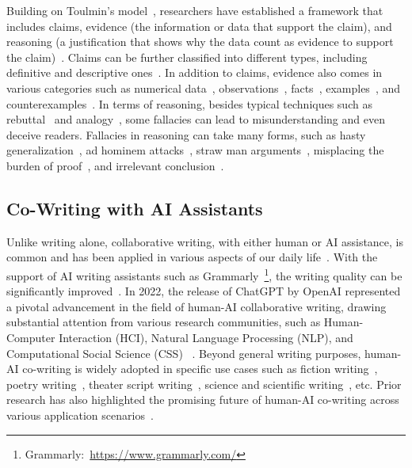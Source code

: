 Building on Toulmin's model~\cite{toulmin_uses_2003}, researchers have established a framework that includes claims, evidence (the information or data that support the claim), and reasoning (a justification that shows why the data count as evidence to support the claim)~\cite{berland_making_2009}. Claims can be further classified into different types, including definitive and descriptive ones~\cite{van_der_wall_statement_2012}. In addition to claims, evidence also comes in various categories such as numerical data~\cite{berland_making_2009}, observations~\cite{berland_making_2009}, facts~\cite{berland_making_2009}, examples~\cite{southerland_examples_2017}, and counterexamples~\cite{johnson-laird_how_2008}. In terms of reasoning, besides typical techniques such as rebuttal~\cite{toulmin_uses_2003} and analogy~\cite{winebrenner_argumentation_1991}, some fallacies can lead to misunderstanding and even deceive readers. Fallacies in reasoning can take many forms, such as hasty generalization~\cite{van_eemeren_argumentation_2016,kord_grey_2021}, ad hominem attacks~\cite{van_eemeren_argumentation_2016, kord_grey_2021}, straw man arguments~\cite{van_eemeren_argumentation_2016}, misplacing the burden of proof~\cite{kord_grey_2021}, and irrelevant conclusion~\cite{kord_grey_2021}.

\subsection{Co-Writing with AI Assistants}

Unlike writing alone, collaborative writing, with either human or AI assistance, is common and has been applied in various aspects of our daily life~\cite{storch_collaborative_2005, li_computer-mediated_2018, barile_computer-mediated_2002}. With the support of AI writing assistants such as Grammarly~\footnote{Grammarly:~\url{https://www.grammarly.com/}}, the writing quality can be significantly improved~\cite{fitria_grammarly_2021}. In 2022, the release of ChatGPT by OpenAI represented a pivotal advancement in the field of human-AI collaborative writing, drawing substantial attention from various research communities, such as Human-Computer Interaction (HCI), Natural Language Processing (NLP), and Computational Social Science (CSS)  ~\cite{lee_design_2024}. Beyond general writing purposes, human-AI co-writing is widely adopted in specific use cases such as fiction writing~\cite{zhong_fiction-writing_2023,yang_ai_2022}, poetry writing~\cite{lc_imitations_2022}, theater script writing~\cite{mirowski_co-writing_2023}, science and scientific writing~\cite{gero_sparks_2022, kim_metaphorian_2023, shen_convxai_2023}, etc. Prior research has also highlighted the promising future of human-AI co-writing across various application scenarios~\cite{luther_teaming_2024}.

